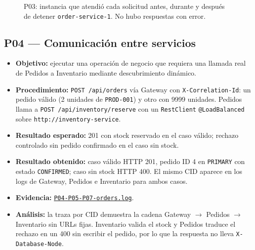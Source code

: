 \documentclass[
  spanish,
  a4paper,
  11pt
]{article}
\providecommand{\tightlist}{\setlength{\itemsep}{0pt}\setlength{\parskip}{0pt}}
\newcommand{\evid}[1]{\href{https://github.com/yan2005dris-afk/SDCC---microservices-with-gateway-and-loadbalancer/blob/develop/docs/evidencias/#1}{{\urlstyle{tt}\nolinkurl{#1}}}}
\begin{document}
\begin{figure}[H]
\centering
{}
\caption{P03: instancia que atendió cada solicitud antes, durante y después de detener \texttt{order-service-1}. No hubo respuestas con error.}
\label{fig:p03}
\end{figure}


\subsection{P04 --- Comunicación entre servicios}
\begin{itemize}
\tightlist
\item \textbf{Objetivo:} ejecutar una operación de negocio que requiera una llamada real de Pedidos a Inventario mediante descubrimiento dinámico.
\item \textbf{Procedimiento:} \texttt{POST /api/orders} vía Gateway con \texttt{X-Correlation-Id}: un pedido válido (2 unidades de \texttt{PROD-001}) y otro con 9999 unidades. Pedidos llama a \texttt{POST /api/inventory/reserve} con un \texttt{RestClient} \texttt{@LoadBalanced} sobre \texttt{http://inventory-service}.
\item \textbf{Resultado esperado:} 201 con stock reservado en el caso válido; rechazo controlado sin pedido confirmado en el caso sin stock.
\item \textbf{Resultado obtenido:} caso válido HTTP 201, pedido ID 4 en \texttt{PRIMARY} con estado \texttt{CONFIRMED}; caso sin stock HTTP 400. El mismo CID aparece en los logs de Gateway, Pedidos e Inventario para ambos casos.
\item \textbf{Evidencia:} \evid{P04-P05-P07-orders.log}.
\item \textbf{Análisis:} la traza por CID demuestra la cadena Gateway $\rightarrow$ Pedidos $\rightarrow$ Inventario sin URLs fijas. Inventario valida el stock y Pedidos traduce el rechazo en un 400 sin escribir el pedido, por lo que la respuesta no lleva \texttt{X-Database-Node}.
\end{itemize}
\end{document}
